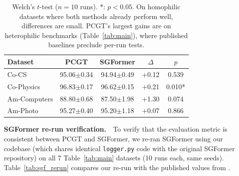 \documentclass[sigconf]{acmart}
\begin{document}
\begin{table}[t]
\centering
\small
\setlength{\tabcolsep}{4pt}
\begin{tabular}{l|cc|cc}
\toprule
\textbf{Dataset} & \textbf{PCGT} & \textbf{SGFormer} & $\Delta$ & $p$ \\
\midrule
Co-CS        & 95.06{\scriptsize$\pm$0.34} & 94.94{\scriptsize$\pm$0.49} & +0.12 & 0.539 \\
Co-Physics   & 96.83{\scriptsize$\pm$0.17} & 96.62{\scriptsize$\pm$0.15} & +0.21 & 0.010* \\
Am-Computers & 88.80{\scriptsize$\pm$0.68} & 87.50{\scriptsize$\pm$1.98} & +1.30 & 0.074 \\
Am-Photo     & 95.27{\scriptsize$\pm$0.40} & 95.20{\scriptsize$\pm$1.18} & +0.07 & 0.866 \\
\bottomrule
\end{tabular}
\caption{Welch's $t$-test ($n=10$ runs). $*$: $p < 0.05$. On homophilic datasets where both methods already perform well, differences are small. PCGT's largest gains are on heterophilic benchmarks (Table~\ref{tab:main}), where published baselines preclude per-run tests.}
\label{tab:pvalues}
\end{table}

\textbf{SGFormer re-run verification.}~~To verify that the evaluation metric is consistent between PCGT and SGFormer, we re-ran SGFormer using our codebase (which shares identical \texttt{logger.py} code with the original SGFormer repository) on all 7 Table~\ref{tab:main} datasets (10 runs each, same seeds). Table~\ref{tab:sgf_rerun} compares our re-run with the published values from \citet{wu2023sgformer}.
\end{document}
